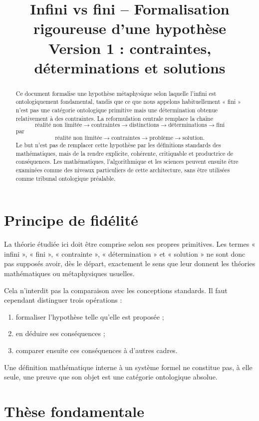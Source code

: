 \documentclass[11pt,a4paper]{article}
\title{\textbf{Infini vs fini -- Formalisation rigoureuse d'une hypothèse}\\
\large Version 1 : contraintes, déterminations et solutions}
\author{}
\date{}
\begin{document}
\maketitle

\begin{abstract}
Ce document formalise une hypothèse métaphysique selon laquelle l'infini est
ontologiquement fondamental, tandis que ce que nous appelons habituellement
« fini » n'est pas une catégorie ontologique primitive mais une détermination
obtenue relativement à des contraintes. La reformulation centrale remplace
la chaîne
\[
\text{réalité non limitée}\to\text{contraintes}\to\text{distinctions}
\to\text{déterminations}\to\text{fini}
\]
par
\[
\boxed{
\text{réalité non limitée}\to\text{contraintes}\to\text{problème}
\to\text{solution}.
}
\]
Le but n'est pas de remplacer cette hypothèse par les définitions standards
des mathématiques, mais de la rendre explicite, cohérente, critiquable et
productrice de conséquences. Les mathématiques, l'algorithmique et les
sciences peuvent ensuite être examinées comme des niveaux particuliers de
cette architecture, sans être utilisées comme tribunal ontologique préalable.
\end{abstract}

\section{Principe de fidélité}

La théorie étudiée ici doit être comprise selon ses propres primitives.
Les termes « infini », « fini », « contrainte », « détermination » et
« solution » ne sont donc pas supposés avoir, dès le départ, exactement le
sens que leur donnent les théories mathématiques ou métaphysiques usuelles.

Cela n'interdit pas la comparaison avec les conceptions standards. Il faut
cependant distinguer trois opérations :
\begin{enumerate}
\item formaliser l'hypothèse telle qu'elle est proposée ;
\item en déduire ses conséquences ;
\item comparer ensuite ces conséquences à d'autres cadres.
\end{enumerate}
Une définition mathématique interne à un système formel ne constitue pas, à
elle seule, une preuve que son objet est une catégorie ontologique absolue.

\section{Thèse fondamentale}
\end{document}
